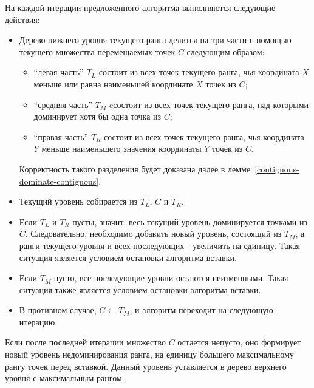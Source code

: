 На каждой итерации предложенного алгоритма выполняются следующие действия:
\begin{itemize}
    \item Дерево нижнего уровня текущего ранга делится на три части с помощью
          текущего множества перемещаемых точек $C$ следующим образом:
    \begin{itemize}
        \item ``левая часть'' $T_L$ состоит из всех точек текущего ранга, чья координата
              $X$ меньше или равна наименьшей координате $X$ точек из $C$;
        \item ``средняя часть'' $T_M$ cсостоит из всех точек текущего ранга,
              над которыми доминирует хотя бы одна точка из $C$;
        \item ``правая часть'' $T_R$ состоит из всех точек текущего ранга,
              чья координата $Y$ меньше наименьшего значения координаты $Y$ точек из $C$.
    \end{itemize}
    Корректность такого разделения будет доказана далее в лемме~\ref{contiguous-dominate-contiguous}.
    \item Текущий уровень собирается из $T_L$, $C$ и $T_R$.
    \item Если $T_L$ и $T_R$ пусты, значит, весь текущий уровень доминируется точками из $C$.
          Следовательно, необходимо добавить новый уровень, состоящий из $T_M$, а ранги 
          текущего уровня и всех последующих - увеличить на единицу.
          Такая ситуация является условием остановки алгоритма вставки.
    \item Если $T_M$ пусто, все последующие уровни остаются неизменными.
          Такая ситуация также является условием остановки алгоритма вставки.
    \item В противном случае, $C \gets T_M$, и алгоритм переходит на следующую итерацию.
\end{itemize}
Если после последней итерации множество $C$ остается непусто, оно формирует новый уровень недоминирования
ранга, на единицу большего максимальному рангу точек перед вставкой. Данный уровень уставляется в дерево 
верхнего уровня с максимальным рангом.

